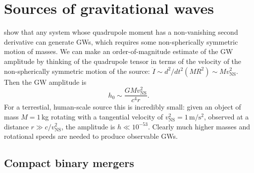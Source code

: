 \section{Sources of gravitational waves}\label{sec:gw-sources}

 show that any system whose quadrupole moment has a non-vanishing second derivative can generate \acp{GW}, which requires some non-spherically symmetric motion of masses.
We can make an order-of-magnitude estimate of the GW amplitude by thinking of the quadrupole tensor in terms of the velocity of the non-spherically symmetric motion of the source: $\ddot{I} \sim d^2/dt^2 (M R^2) \sim M v_{\textrm{NS}}^2$.
Then the GW amplitude is
\begin{equation}
	h_0 \sim \frac{GM v_{\textrm{NS}}^2}{c^4 r}.
\end{equation}
For a terrestial, human-scale source this is incredibly small: given an object of mass $M=1$\,kg rotating with a tangential velocity of $v_{\textrm{NS}}^2=1\,\mathrm{m/s^2}$, observed at a distance $r \gg c/v_{\textrm{NS}}^2$, the amplitude is $h \ll 10^{-53}$.
Clearly much higher masses and rotational speeds are needed to produce observable GWs.


\subsection{Compact binary mergers}

